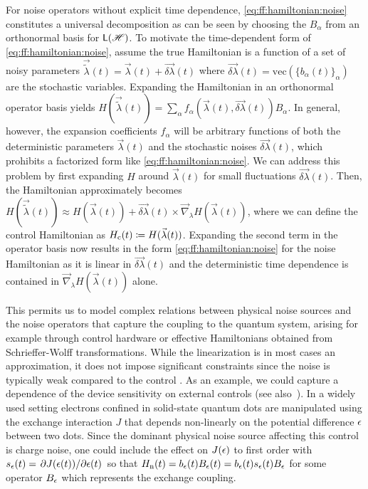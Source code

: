 For noise operators without explicit time dependence, \cref{eq:ff:hamiltonian:noise} constitutes a universal decomposition as can be seen by choosing the $B_\alpha$ from an orthonormal basis for $\mathsf{L}(\mathscr{H})$.
To motivate the time-dependent form of \cref{eq:ff:hamiltonian:noise}, assume the true Hamiltonian is a function of a set of noisy parameters $\vec{\tilde{\lambda}}(t) = \vec{\lambda}(t) + \vec{\delta\lambda}(t)$ where $\vec{\delta\lambda}(t) = \text{vec}(\{b_\alpha(t)\}_\alpha)$ are the stochastic variables.
Expanding the Hamiltonian in an orthonormal operator basis yields $H(\vec{\tilde{\lambda}}(t)) = \sum_\alpha f_\alpha(\vec{\lambda}(t), \vec{\delta\lambda}(t)) B_\alpha$.
In general, however, the expansion coefficients $f_\alpha$ will be arbitrary functions of both the deterministic parameters $\vec{\lambda}(t)$ and the stochastic noises $\vec{\delta\lambda}(t)$, which prohibits a factorized form like \cref{eq:ff:hamiltonian:noise}.
We can address this problem by first expanding $H$ around $\vec{\lambda}(t)$ for small fluctuations $\vec{\delta\lambda}(t)$.
Then, the Hamiltonian approximately becomes $H(\vec{\tilde{\lambda}}(t)) \approx H(\vec{\lambda}(t)) + \vec{\delta\lambda}(t)\times\vec{\nabla}_{\lambda} H(\vec{\lambda}(t))$, where we can define the control Hamiltonian as $H_{\mathrm{c}}(t)\coloneqq H(\vec{\lambda}(t))$.
Expanding the second term in the operator basis now results in the form \eqref{eq:ff:hamiltonian:noise} for the noise Hamiltonian as it is linear in $\vec{\delta\lambda}(t)$ and the deterministic time dependence is contained in $\vec{\nabla}_{\lambda} H(\vec{\lambda}(t))$ alone.

This permits us to model complex relations between physical noise sources and the noise operators that capture the coupling to the quantum system, arising for example through control hardware or effective Hamiltonians obtained from \eg Schrieffer-Wolff transformations.
While the linearization is in most cases an approximation, it does not impose significant constraints since the noise is typically weak compared to the control .
As an example, we could capture a dependence of the device sensitivity on external controls (see also~).
In a widely used setting electrons confined in solid-state quantum dots are manipulated using the exchange interaction $J$ that depends non-linearly on the potential difference $\epsilon$ between two dots.
Since the dominant physical noise source affecting this control is charge noise, one could include the effect on $J(\epsilon)$ to first order with $s_\epsilon(t)=\pdv*{J(\epsilon(t))}{\epsilon(t)}$ so that $H_{\mathrm{n}}(t) = b_\epsilon(t) B_\epsilon(t)  =  b_\epsilon(t) s_\epsilon(t) B_\epsilon$ for some operator $B_\epsilon$ which represents the exchange coupling.

